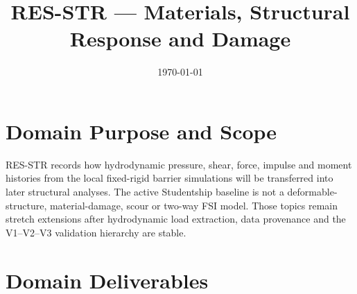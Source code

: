 \documentclass[12pt,a4paper]{article}
\title{RES-STR --- Materials, Structural Response and Damage}
\author{}
\date{\today}
\begin{document}
\maketitle

\tableofcontents
\clearpage

\section{Domain Purpose and Scope}
\label{sec:res-str-domain-purpose}

RES-STR records how hydrodynamic pressure, shear, force, impulse and
moment histories from the local fixed-rigid barrier simulations will
be transferred into later structural analyses. The active Studentship
baseline is not a deformable-structure, material-damage, scour or
two-way FSI model. Those topics remain stretch extensions after
hydrodynamic load extraction, data provenance and the V1--V2--V3
validation hierarchy are stable.

\section{Domain Deliverables}
\label{sec:res-str-domain-deliverables}










\clearpage
\printbibliography[
  heading=bibintoc,
  title={References}
]
\end{document}
